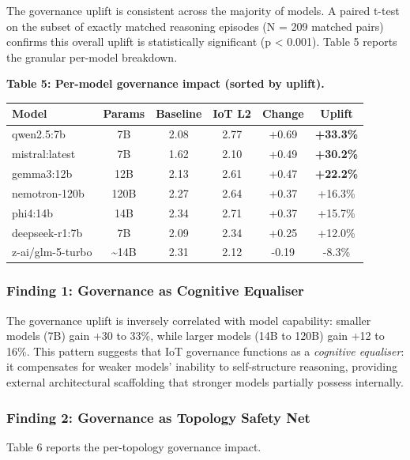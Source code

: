 \documentclass[11pt,a4paper]{article}
\begin{document}
The governance uplift is consistent across the majority of models. A
paired t-test on the subset of exactly matched reasoning episodes (N =
209 matched pairs) confirms this overall uplift is statistically
significant (p \textless{} 0.001). Table 5 reports the granular
per-model breakdown.

\textbf{Table 5: Per-model governance impact (sorted by uplift).}

{\small\begin{longtable}[]{@{}lccccc@{}}
\toprule\noalign{}
Model & Params & Baseline & IoT L2 & Change & Uplift \\
\midrule\noalign{}
\endhead
\bottomrule\noalign{}
\endlastfoot
qwen2.5:7b & 7B & 2.08 & 2.77 & +0.69 & \textbf{+33.3\%} \\
mistral:latest & 7B & 1.62 & 2.10 & +0.49 & \textbf{+30.2\%} \\
gemma3:12b & 12B & 2.13 & 2.61 & +0.47 & \textbf{+22.2\%} \\
nemotron-120b & 120B & 2.27 & 2.64 & +0.37 & +16.3\% \\
phi4:14b & 14B & 2.34 & 2.71 & +0.37 & +15.7\% \\
deepseek-r1:7b & 7B & 2.09 & 2.34 & +0.25 & +12.0\% \\
z-ai/glm-5-turbo & \textasciitilde14B & 2.31 & 2.12 & -0.19 & -8.3\% \\
\end{longtable}}

\subsubsection{Finding 1: Governance as Cognitive
Equaliser}\label{finding-1-governance-as-cognitive-equaliser}

The governance uplift is inversely correlated with model capability:
smaller models (7B) gain +30 to 33\%, while larger models (14B to 120B)
gain +12 to 16\%. This pattern suggests that IoT governance functions as
a \emph{cognitive equaliser}: it compensates for weaker models'
inability to self-structure reasoning, providing external architectural
scaffolding that stronger models partially possess internally.

\subsubsection{Finding 2: Governance as Topology Safety
Net}\label{finding-2-governance-as-topology-safety-net}

Table 6 reports the per-topology governance impact.
\end{document}
